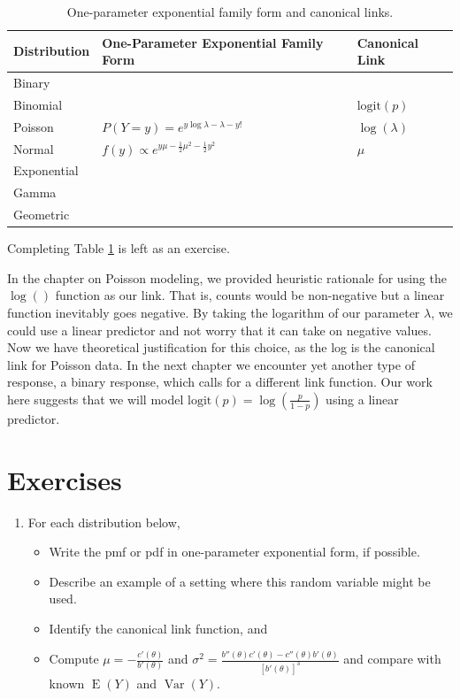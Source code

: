 \documentclass[
]{krantz}
\providecommand{\tightlist}{%
  \setlength{\itemsep}{0pt}\setlength{\parskip}{0pt}}
\newcommand{\E}{\operatorname{E}}
\newcommand{\var}{\operatorname{Var}}
\begin{document}
\begin{table}

\caption{\label{tab:table1chp5}One-parameter exponential family form and canonical links.}
\centering
\begin{tabular}[t]{lll}
\toprule
Distribution & One-Parameter Exponential Family Form & Canonical Link\\
\midrule
Binary &  & \\
Binomial &  & $\text{logit}(p)$\\
Poisson & $P(Y=y) = e^{y\log\lambda - \lambda - y!}$ & $\log(\lambda)$\\
Normal & $f(y) \propto e^{y\mu -\frac{1}{2}\mu^2 -\frac{1}{2}y^2}$ & $\mu$\\
Exponential &  & \\
\addlinespace
Gamma &  & \\
Geometric &  & \\
\bottomrule
\end{tabular}
\end{table}

Completing Table \ref{tab:table1chp5} is left as an exercise.

In the chapter on Poisson modeling, we provided heuristic rationale for using the \(\log()\) function as our link. That is, counts would be non-negative but a linear function inevitably goes negative. By taking the logarithm of our parameter \(\lambda\), we could use a linear predictor and not worry that it can take on negative values. Now we have theoretical justification for this choice, as the log is the canonical link for Poisson data. In the next chapter we encounter yet another type of response, a binary response, which calls for a different link function. Our work here suggests that we will model \(\text{logit}(p)=\log\left(\frac{p}{1-p}\right)\) using a linear predictor.

\hypertarget{exercises-4}{%
\section{Exercises}\label{exercises-4}}

\begin{enumerate}
\def\labelenumi{\arabic{enumi}.}
\item
  For each distribution below,

  \begin{itemize}
  \tightlist
  \item
    Write the pmf or pdf in one-parameter exponential form, if possible.
  \item
    Describe an example of a setting where this random variable might be used.
  \item
    Identify the canonical link function, and
  \item
    Compute \(\mu = -\frac{c'(\theta)}{b'(\theta)}\) and \(\sigma^2 = \frac{b''(\theta)c'(\theta)-c''(\theta)b'(\theta)}{[b'(\theta)]^3}\) and compare with known \(\E(Y)\) and \(\var(Y)\).
  \end{itemize}
\end{enumerate}
\end{document}
